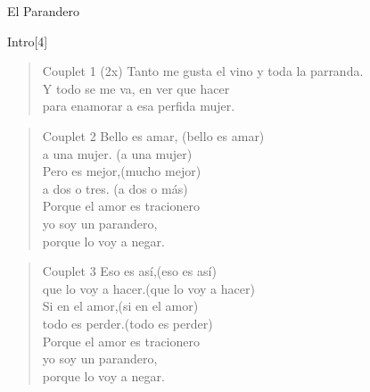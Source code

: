 \begin{song}{El Parandero}

\begin{instrumental}{Intro}[4]
   \measure{}
   
 \measure{}  \measure{}
   
\end{instrumental}

\begin{verse}{Couplet 1 \textnormal{(2x)}}
Tanto me gusta el vino y toda la parranda.\\
Y todo se me va, en ver que hacer\\
para enamorar a esa perfida mujer. \hspace{1em} 
\end{verse}

\begin{verse}{Couplet 2}
Bello es amar, \hspace{6em}(bello es amar)\\
a una mujer.\hspace{6.9em} (a una mujer)\\
Pero \chord{}es mejor,\hspace{6.3em}(mucho mejor)\\
a dos o tres. \hspace{6.9em}(a dos o más)\\
Porque el amor es tracionero\\
yo soy un parandero,\\
porque lo voy a negar.  \hspace{1em} 
\end{verse}

\begin{verse}{Couplet 3}
Eso es así,\hspace{7.7em}(eso es así)\\
que lo voy a hacer.\hspace{4.3em}(que lo voy a hacer)\\
Si en \chord{}el amor,\hspace{6.6em}(si en el amor)\\
todo es perder.\hspace{6em}(todo es perder)\\
Porque el amor es tracionero\\
yo soy un parandero,\\
porque lo voy a negar.  \hspace{1em} 
\end{verse}

\end{song}

